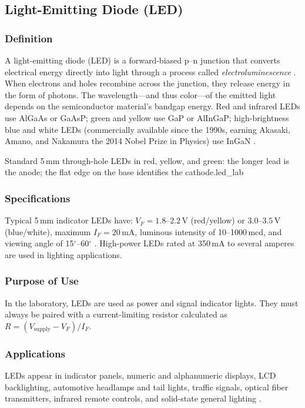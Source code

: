 \subsection{Light-Emitting Diode (LED)}

\subsubsection*{Definition}
A light-emitting diode (LED) is a forward-biased p--n junction that converts electrical
energy directly into light through a process called \textit{electroluminescence}
\cite{sedra2020}. When electrons and holes recombine across the junction, they release
energy in the form of photons. The wavelength---and thus color---of the emitted light
depends on the semiconductor material's bandgap energy. Red and infrared LEDs use
AlGaAs or GaAsP; green and yellow use GaP or AlInGaP; high-brightness blue and white
LEDs (commercially available since the 1990s, earning Akasaki, Amano, and Nakamura the
2014 Nobel Prize in Physics) use InGaN \cite{razavi2013}.

%
  {Standard 5\,mm through-hole LEDs in red, yellow, and green: the longer
   lead is the anode; the flat edge on the base identifies the cathode.}{led_lab}

\subsubsection*{Specifications}
Typical 5\,mm indicator LEDs have: $V_F = 1.8$--$2.2$\,V (red/yellow) or
$3.0$--$3.5$\,V (blue/white), maximum $I_F = 20$\,mA, luminous intensity of
10--1000\,mcd, and viewing angle of 15$^\circ$--60$^\circ$ \cite{horowitz2015}.
High-power LEDs rated at 350\,mA to several amperes are used in lighting applications.

\subsubsection*{Purpose of Use}
In the laboratory, LEDs are used as power and signal indicator lights. They must always
be paired with a current-limiting resistor calculated as
$R = (V_\text{supply} - V_F) / I_F$.

\subsubsection*{Applications}
LEDs appear in indicator panels, numeric and alphanumeric displays, LCD backlighting,
automotive headlamps and tail lights, traffic signals, optical fiber transmitters,
infrared remote controls, and solid-state general lighting \cite{razavi2013}.
